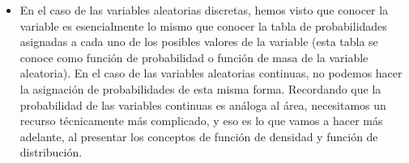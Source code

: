 \begin{itemize}
\begin{Ejemplo}
            En el Ejemplo \ref{ejem:probabilidadCondicionadaLanzamientoDosDados} (página \pageref{ejem:probabilidadCondicionadaLanzamientoDosDados}) nos hicimos la pregunta {\em `` ¿Cuál es la probabilidad de que la diferencia entre los valores de ambos dados (mayor-menor) sea menor que 4, sabiendo que la suma de los dados es 7?''} Está claro, con la notación que usamos ahora, que estamos preguntando cuál es la probabilidad del suceso
            \[(X<4)\cap (Y=7).\]
            ¿Podemos calcular este número usando sólo las tablas de probabilidad de $X$ e $Y$, sin utilizar más información sobre el suceso muestral subyacente?\qed
            \end{Ejemplo}
        \item En el caso de las variables aleatorias discretas, hemos visto que conocer la variable es esencialmente lo mismo que conocer la tabla de probabilidades asignadas a cada uno de los posibles valores de la variable (esta tabla se conoce como {\sf función de probabilidad o función de masa} de la variable aleatoria). En el caso de las variables aleatorias continuas, no podemos hacer la asignación de probabilidades de esta misma forma. Recordando que la probabilidad de las variables continuas es análoga al área, necesitamos un recurso técnicamente más complicado, y eso es lo que vamos a hacer más adelante, al presentar los conceptos de función de densidad y función de distribución.
\end{itemize}


